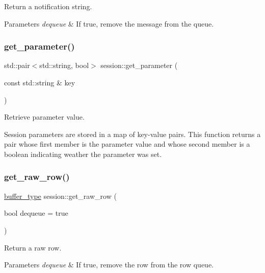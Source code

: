 Return a notification string. 


\begin{DoxyParams}{Parameters}
{\em dequeue} & If true, remove the message from the queue. \\
\hline
\end{DoxyParams}
\mbox{\label{classsession_ae5fddc8982be0e4568c7b6cf1a05fa09}} 
\subsubsection{\texorpdfstring{get\+\_\+parameter()}{get\_parameter()}}
{\footnotesize\ttfamily std\+::pair$<$std\+::string, bool$>$ session\+::get\+\_\+parameter (\begin{DoxyParamCaption}\item[{const std\+::string \&}]{key }\end{DoxyParamCaption})\hspace{0.3cm}{\ttfamily [inline]}}



Retrieve parameter value. 

Session parameters are stored in a map of key-\/value pairs. This function returns a pair whose first member is the parameter value and whose second member is a boolean indicating weather the parameter was set. \mbox{\label{classsession_ab16f4a42b8f6c3535a28316548ba4955}} 
\subsubsection{\texorpdfstring{get\+\_\+raw\+\_\+row()}{get\_raw\_row()}}
{\footnotesize\ttfamily \hyperlink{classsession_a6d23252848c7fc9419e4bf318d57b43d}{buffer\+\_\+type} session\+::get\+\_\+raw\+\_\+row (\begin{DoxyParamCaption}\item[{bool}]{dequeue = {\ttfamily true} }\end{DoxyParamCaption})\hspace{0.3cm}{\ttfamily [inline]}}



Return a raw row. 


\begin{DoxyParams}{Parameters}
{\em dequeue} & If true, remove the row from the row queue. \\
\hline
\end{DoxyParams}
\mbox{\label{classsession_a1f9bd2fa3a65f315c20b39a7b3c006bb}} 
